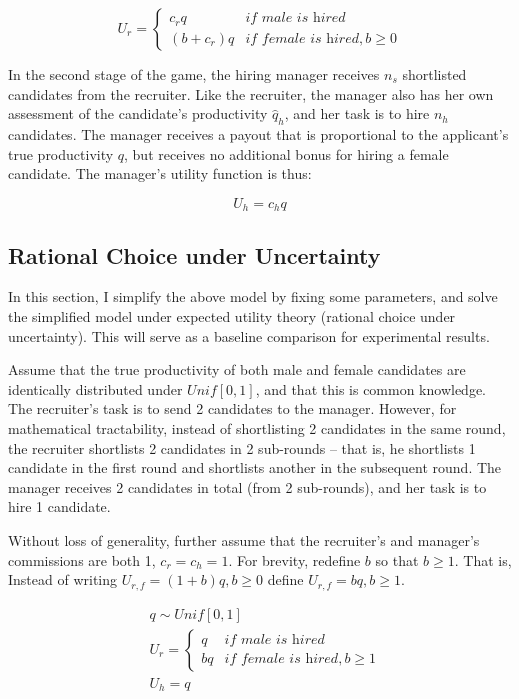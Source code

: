 \documentclass[11pt]{article}
\begin{document}
\[  U_r =
    \begin{cases}
        c_rq     & \textit{if male is hired}             \\
        (b+c_r)q & \textit{if female is hired}, b \geq 0
    \end{cases}
\]

In the second stage of the game, the hiring manager receives $n_s$ shortlisted candidates from the recruiter. Like the recruiter, the manager also has her own assessment of the candidate's productivity $\hat{q}_h$, and her task is to hire $n_h$ candidates. The manager receives a payout that is proportional to the applicant's true productivity $q$, but receives no additional bonus for hiring a female candidate. The manager's utility function is thus:

$$U_h = c_hq$$

\subsection{Rational Choice under Uncertainty}

In this section, I simplify the above model by fixing some parameters, and solve the simplified model under expected utility theory (rational choice under uncertainty). This will serve as a baseline comparison for experimental results.

Assume that the true productivity of both male and female candidates are identically distributed under $\textit{Unif}[0,1]$, and that this is common knowledge.
The recruiter's task is to send 2 candidates to the manager. However, for mathematical tractability, instead of shortlisting 2 candidates in the same round, the recruiter shortlists 2 candidates in 2 sub-rounds -- that is, he shortlists 1 candidate in the first round and shortlists another in the subsequent round. The manager receives 2 candidates in total (from 2 sub-rounds), and her task is to hire 1 candidate.

Without loss of generality, further assume that the recruiter's and manager's commissions are both 1, $c_r=c_h=1$. For brevity, redefine $b$ so that $b \geq 1$. That is, Instead of writing $U_{r,f} = (1+b)q, b \geq 0$  define $U_{r,f} = bq, b \geq 1$.

\begin{align*}
     & q \sim \textit{Unif}[0,1] \\
     & U_r =
    \begin{cases}
        q  & \textit{if male is hired}             \\
        bq & \textit{if female is hired}, b \geq 1
    \end{cases}    \\
     & U_h = q
\end{align*}
\end{document}
